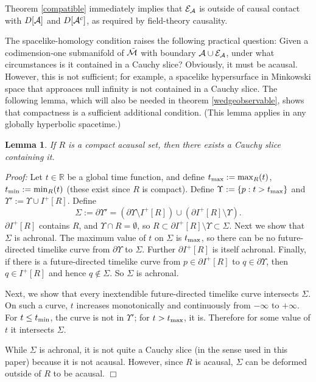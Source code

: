 \documentclass[12pt]{article}
\def\bdyI{I}
\def\bulk{{\cal M}}
\def\overM{\tilde \bulk}
\def\regA{{\cal A}}
\def\regAc{{\cal A}^c}
\def\extr{{\cal E}_\regA}
\newtheorem{lemma}[theorem]{Lemma}
\begin{document}
Theorem \ref{compatible} immediately implies that $\extr$ is outside of causal contact with $D[\regA]$ and $D[\regAc]$, as required by field-theory causality.

The spacelike-homology condition raises the following practical question: Given a codimension-one submanifold of $\overM$ with boundary $\regA\cup\extr$, under what circumstances is it contained in a Cauchy slice? Obviously, it must be acausal. However, this is not sufficient; for example, a spacelike hypersurface in Minkowski space that approaces null infinity is not contained in a Cauchy slice. The following lemma, which will also be needed in theorem \ref{wedgeobservable}, shows that compactness is a sufficient additional condition. (This lemma applies in any globally hyperbolic spacetime.)

\begin{lemma}If $R$ is a compact acausal set, then there exists a Cauchy slice containing it.\label{Cauchyexistence}\end{lemma}

\emph{Proof:} Let $t \in {\mathbb R}$ be a global time function, and define $t_{\rm max}:=\max_R(t)$, $t_{\rm min}:=\min_R(t)$ (these exist since $R$ is compact). Define $\Upsilon:=\{p:t>t_{\rm max}\}$ and $\Upsilon':= \Upsilon \cup \bdyI^+[R]$. Define
%
\begin{equation}
\Sigma:= \partial \Upsilon'= \left(\partial \Upsilon\setminus \bdyI^+[R]\right)\cup \left( \partial\bdyI^+[R]\setminus \Upsilon\right).
\end{equation}
%
$\partial \bdyI^+[R]$ contains $R$, and $\Upsilon\cap R=\emptyset$, so $R\subset\partial \bdyI^+[R]\setminus \Upsilon\subset\Sigma$. Next we show that $\Sigma$ is achronal. The maximum value of $t$ on $\Sigma$ is $t_{\rm max}$, so there can be no future-directed timelike curve from $\partial \Upsilon$ to $\Sigma$. Further $\partial \bdyI^+[R]$ is itself achronal. Finally, if there is a future-directed timelike curve from $p\in\partial \bdyI^+[R]$ to $q\in\partial\Upsilon$, then $q\in \bdyI^+[R]$ and hence $q\not\in\Sigma$. So $\Sigma$ is achronal. 

Next, we show that every inextendible future-directed timelike curve intersects $\Sigma$. On such a curve, $t$ increases monotonically and continuously from $-\infty$ to $+\infty$. For $t\le t_{\rm min}$, the curve is not in $\Upsilon'$; for $t>t_{\rm max}$, it is. Therefore for some value of $t$ it intersects $\Sigma$. 

While $\Sigma$ is achronal, it is not quite a Cauchy slice (in the sense used in this paper) because it is not acausal. However, since $R$ is acausal, $\Sigma$ can be deformed outside of $R$ to be acausal. $\Box$
\end{document}
